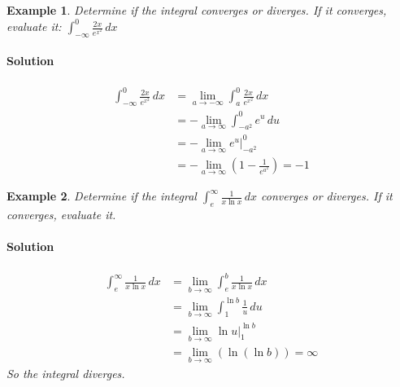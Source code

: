 \documentclass[letterpaper, 11pt, openany]{book}
\theoremstyle{mytheoremstyle}
\theoremstyle{myexamplestyle}
\newtheorem{example}{Example}[section]
\newenvironment{solution}{\paragraph{\sffamily \smaller \fontseries{b}\selectfont Solution}}{\hfill\faSquare}
\begin{document}
\begin{example}\label{e:impintsub}
    Determine if the integral converges or diverges. If it converges, evaluate it: $\displaystyle \int_{-\infty}^{0} \frac{2x}{e^{x^{2}}} \, dx$
    
    \begin{solution}
        \begin{align*}
            \int_{-\infty}^{0} \frac{2x}{e^{x^{2}}} \, dx   &= \lim_{a \to -\infty} \int_{a}^{0} \frac{2x}{e^{x^{2}}} \, dx\\
                                                        &=  -\lim_{a \to \infty} \int_{-a^{2}}^{0} e^{u}\, du \\
                                                        &=  -\lim_{a \to \infty} e^{u} \bigg|_{-a^{2}}^{0}\\
                                                        &= -\lim_{a \to \infty} \left( 1 - \frac{1}{e^{a^{2}}} \right) = -1
        \end{align*}
    \end{solution}
\end{example}

\begin{example}\label{e:impintdiv}
    Determine if the integral $\displaystyle \int_{e}^{\infty} \frac{1}{x\ln x} \, dx$ converges or diverges. If it converges, evaluate it. 
    
    \begin{solution}
        \begin{align*}
            \int_{e}^{\infty} \frac{1}{x\ln x} \, dx    &= \lim_{b \to \infty} \int_{e}^{b} \frac{1}{x\ln x} \, dx\\
                                                        &= \lim_{b \to \infty} \int_{1}^{\ln b} \frac{1}{u} \, du\\
                                                        &= \lim_{b \to \infty} \ln u \Big|_{1}^{\ln b}\\
                                                        &= \lim_{b \to \infty} \left( \ln\left( \ln b \right) \right) = \infty
        \end{align*}
        So the integral diverges.
    \end{solution}
\end{example}
\end{document}
